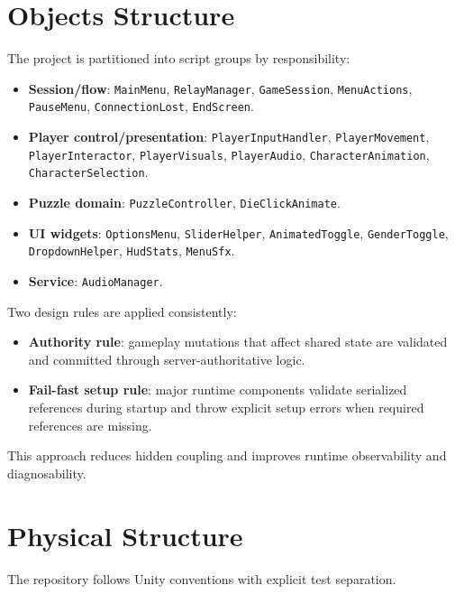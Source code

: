 \section{Objects Structure}
The project is partitioned into script groups by responsibility:
\begin{itemize}
\item \textbf{Session/flow}: \texttt{MainMenu}, \texttt{RelayManager}, \texttt{GameSession}, \texttt{MenuActions}, \texttt{PauseMenu}, \texttt{ConnectionLost}, \texttt{EndScreen}.
\item \textbf{Player control/presentation}: \texttt{PlayerInputHandler}, \texttt{PlayerMovement}, \texttt{PlayerInteractor}, \texttt{PlayerVisuals}, \texttt{PlayerAudio}, \texttt{CharacterAnimation}, \texttt{CharacterSelection}.
\item \textbf{Puzzle domain}: \texttt{PuzzleController}, \texttt{DieClickAnimate}.
\item \textbf{UI widgets}: \texttt{OptionsMenu}, \texttt{SliderHelper}, \texttt{AnimatedToggle}, \texttt{GenderToggle}, \texttt{DropdownHelper}, \texttt{HudStats}, \texttt{MenuSfx}.
\item \textbf{Service}: \texttt{AudioManager}.
\end{itemize}

Two design rules are applied consistently:
\begin{itemize}
\item \textbf{Authority rule}: gameplay mutations that affect shared state are validated and committed through server-authoritative logic.
\item \textbf{Fail-fast setup rule}: major runtime components validate serialized references during startup and throw explicit setup errors when required references are missing.
\end{itemize}

This approach reduces hidden coupling and improves runtime observability and diagnosability.

\section{Physical Structure}
The repository follows Unity conventions with explicit test separation.

